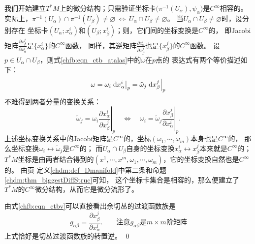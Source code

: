 我们开始建立$T^*M$上的微分结构；只需验证坐标卡$\bigl(\pi^{-1} (U_\alpha),\psi_\alpha\bigr)$是$C^\infty$相容的。
实际上，$\pi^{-1} (U_\alpha) \cap \pi^{-1} (U_\beta) \neq \varnothing \ \Leftrightarrow\ 
U_\alpha \cap U_\beta \neq \varnothing$。
当$U_\alpha \cap U_\beta \neq \varnothing$时，设分别存在
坐标卡$(U_\alpha;x^i_\alpha)$和$(U_\beta;x^i_\beta)$；则，它们间的坐标变换是$C^\infty$的，
即Jacobi矩阵$\frac{\partial {x}^j_\beta}{\partial {x}^i_\alpha}$是$\{x^i_\alpha\}$的$C^\infty$函数，
同样，其逆矩阵$\frac{\partial {x}^i_\alpha}{\partial {x}^j_\beta}$也是$\{{x}^j_\beta\}$的$C^\infty$函数。
设$p \in U_\alpha \cap U_\beta$，则式\eqref{chfb:eqn_ctb_atalas}中的$\omega$在$p$点的
表达式有两个等价描述如下：
\begin{equation*}
    \omega = \omega_i \left. {\rm d}x^i_\alpha \right | _p
    = \tilde{\omega}_j \left. {\rm d}x^j_\beta \right | _p
\end{equation*}
不难得到两者分量的变换关系：
\begin{equation}\label{chfb:eqn_ctbv}
    \tilde{\omega}_j = \omega_i \left. \frac{\partial {x}^i_\alpha}{\partial {x}^j_\beta}  \right | _p
    {\quad \Leftrightarrow \quad}
    \omega_i  = \tilde{\omega}_j \left. \frac{\partial {x}^j_\beta}{\partial {x}^i_\alpha}  \right | _p .
\end{equation}
上述坐标变换关系中的Jacobi矩阵是$C^\infty$的，坐标$(\omega_1,\cdots,\omega_m)$本身也是$C^\infty$的，
那么坐标变换$\omega_i \leftrightarrow \tilde{\omega}_j$是$C^\infty$的；
而$U_\alpha \cap U_\beta$自身的坐标变换$x^i_\alpha \leftrightarrow {x}^j_\beta$本来就是$C^\infty$的；
$T^*M$坐标是由两者结合得到的$(x^1,\cdots,x^m,\omega_1,\cdots,\omega_m)$，它的坐标变换自然也是$C^\infty$的。
由\pageref{chdm:def_Dmanifold}页
定义\ref{chdm:def_Dmanifold}中第二条和命题\ref{chdm:thm_biggestDiffStruc}可知，
这个坐标卡集合是{\kaishu 相容的}，那么便建立了$T^*M$的$C^\infty$微分结构，从而它是微分流形了。

由式\eqref{chfb:eqn_ctbv}可以直接看出余切丛的过渡函数族是
\begin{equation}
    g_{\alpha\beta} = \frac{\partial {x}^j_\beta}{\partial {x}^i_\alpha}  .
    \qquad \text{注意}g_{\alpha\beta}\text{是} m\times m \text{阶矩阵}
\end{equation}
上式恰好是切丛过渡函数族的转置逆。
\qed

